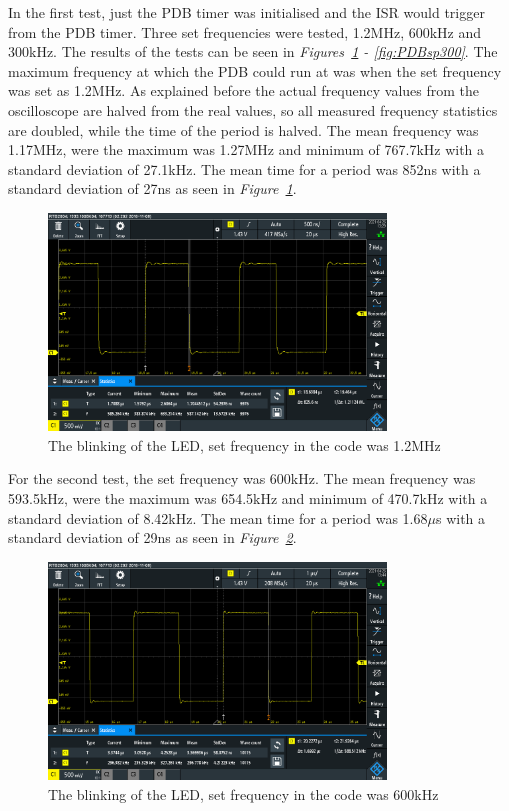 In the first test, just the PDB timer was initialised and the ISR would trigger from the PDB timer.
Three set frequencies were tested, 1.2MHz, 600kHz and 300kHz.
The results of the tests can be seen in \textit{Figures~\ref{fig:PDBSp1200} - \ref{fig:PDBsp300}}.
The maximum frequency at which the PDB could run at was when the set frequency was set as 1.2MHz.
As explained before the actual frequency values from the oscilloscope are halved from the real values, so all measured frequency statistics are doubled, while the time of the period is halved.
The mean frequency was 1.17MHz, were the maximum was 1.27MHz and minimum of 767.7kHz with a standard deviation of 27.1kHz. 
The mean time for a period was 852ns with a standard deviation of 27ns as seen in \textit{Figure~\ref{fig:PDBSp1200}}.

\begin{figure}[h]
    \centering
    \includegraphics[width=0.8\textwidth]{graphics/STAT01_1200.PNG}
    \caption{The blinking of the LED, set frequency in the code was 1.2MHz}
    \label{fig:PDBSp1200}
\end{figure}

For the second test, the set frequency was 600kHz.
The mean frequency was 593.5kHz, were the maximum was 654.5kHz and minimum of 470.7kHz with a standard deviation of 8.42kHz. 
The mean time for a period was 1.68$\mu$s with a standard deviation of 29ns as seen in \textit{Figure~\ref{fig:PDBSp600}}.

\begin{figure}[h]
    \centering
    \includegraphics[width=0.8\textwidth]{graphics/STAT02_600.PNG}
    \caption{The blinking of the LED, set frequency in the code was 600kHz}
    \label{fig:PDBSp600}
\end{figure}

